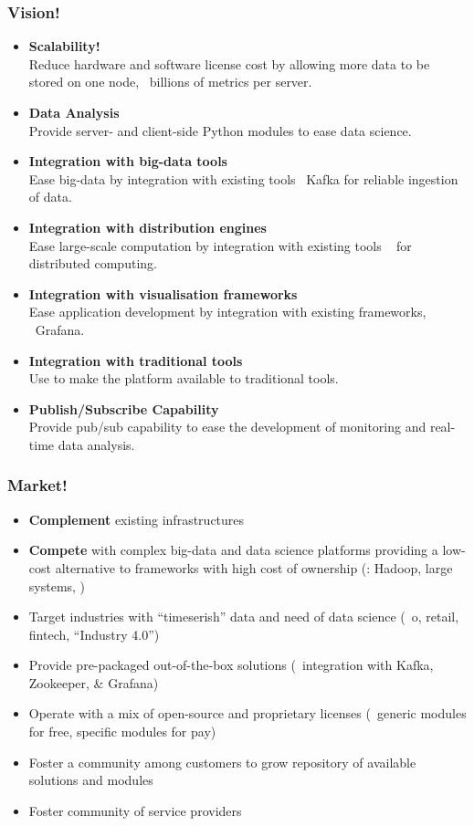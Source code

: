 \documentclass[mathserif,usenames,dvipsnames]{beamer}
\begin{document}
\begin{frame}[shrink]
\frametitle{Vision!}
\begin{itemize}
\item \textbf{Scalability!}\\
      Reduce hardware and software license cost
      by allowing more data to be stored on one node,
      \ie\ billions of metrics per server.
\item \textbf{Data Analysis}\\
      Provide server- and client-side Python modules
      to ease data science.
\item \textbf{Integration with big-data tools}\\
      Ease big-data by integration with existing tools
      \eg\ Kafka for reliable ingestion of data.
\item \textbf{Integration with distribution engines}\\
      Ease large-scale computation by integration with existing tools
      \eg\  for distributed computing.
\item \textbf{Integration with visualisation frameworks}\\
      Ease application development by integration with existing
       frameworks, \eg\ Grafana.
\item \textbf{Integration with traditional tools}\\
      Use  to make the platform available
      to traditional tools.
\item \textbf{Publish/Subscribe Capability}\\
      Provide pub/sub capability to ease the development
      of monitoring and real-time data analysis.
\end{itemize}
\end{frame}

\begin{frame}
\frametitle{Market!}
\begin{itemize}
\item \textbf{Complement} existing  infrastructures
\item \textbf{Compete} with complex big-data and data science platforms
      providing a low-cost alternative 
      to frameworks with high cost of ownership
      (\eg: Hadoop, large  systems, \etc)
\item Target industries with ``timeserish'' data 
      and need of data science
      (\eg\ o, retail, fintech, ``Industry 4.0'')
\item Provide pre-packaged out-of-the-box solutions
      (\eg\ integration with Kafka, Zookeeper,  \& Grafana)
\item Operate with a mix of open-source and proprietary licenses
      (\eg\ generic modules for free, specific modules for pay)
\item Foster a community among customers to grow repository of
      available solutions and modules
\item Foster community of  service providers
\end{itemize}
\end{frame}
\end{document}
